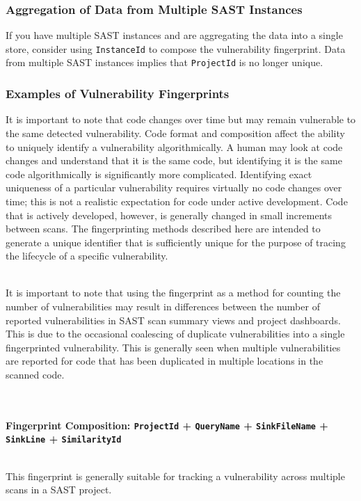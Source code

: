 \subsubsection{Aggregation of Data from Multiple SAST Instances}

If you have multiple SAST instances and are aggregating the data into a single store, consider using \texttt{InstanceId} to compose the vulnerability fingerprint.  Data
from multiple SAST instances implies that \texttt{ProjectId} is no longer unique.

\subsubsection{Examples of Vulnerability Fingerprints}\label{sec:fingerprint}
It is important to note that code changes over time but may remain vulnerable to the same detected vulnerability.  Code format and composition affect
the ability to uniquely identify a vulnerability algorithmically.  A human may look at code changes and understand that it is the same code, but identifying
it is the same code algorithmically is significantly more complicated.  Identifying exact uniqueness of a particular vulnerability requires virtually no code changes
over time; this is not a realistic expectation for code under active development.  Code that is actively developed, however, is generally changed in small 
increments between scans.  The fingerprinting methods described here are intended to generate a unique identifier that is sufficiently unique for the purpose of 
tracing the lifecycle of a specific vulnerability.

\noindent\\It is important to note that using the fingerprint as a method for counting the number of vulnerabilities may result in differences between
the number of reported vulnerabilities in SAST scan summary views and project dashboards.  This is due to the occasional coalescing of duplicate vulnerabilities
into a single fingerprinted vulnerability.  This is generally seen when multiple vulnerabilities are reported for code that has been duplicated in multiple
locations in the scanned code.


\textbf{\noindent\\\\Fingerprint Composition: \texttt{ProjectId} + \texttt{QueryName} + \texttt{SinkFileName} + \texttt{SinkLine} + \texttt{SimilarityId}}

\noindent\\This fingerprint is generally suitable for tracking a vulnerability across multiple scans in a SAST project.    

